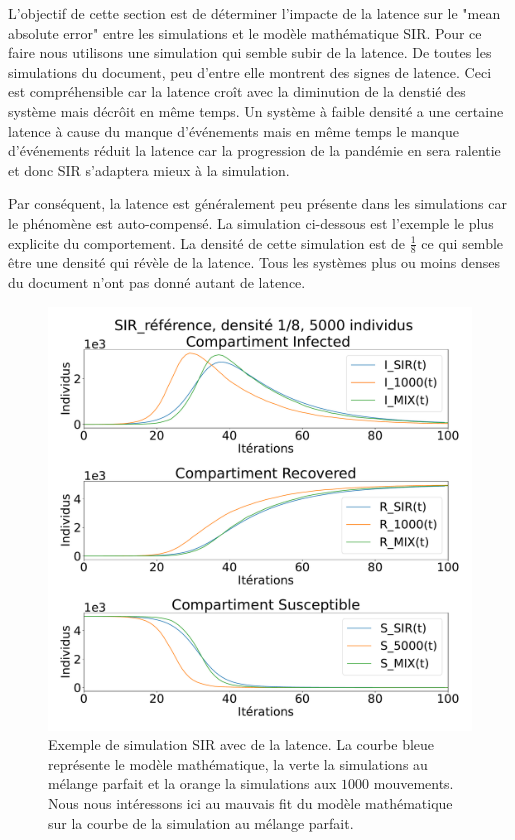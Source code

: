 L'objectif de cette section est de déterminer l'impacte de la latence sur le "mean absolute error" entre les simulations et le modèle mathématique SIR. Pour ce faire nous utilisons une simulation qui semble subir de la latence. De toutes les simulations du document, peu d'entre elle montrent des signes de latence. Ceci est compréhensible car la latence croît avec la diminution de la denstié des système mais décrôit en même temps. Un système à faible densité a une certaine latence à cause du manque d'événements mais en même temps le manque d'événements réduit la latence car la progression de la pandémie en sera ralentie et donc SIR s'adaptera mieux à la simulation.\\

\newpage 

Par conséquent, la latence est généralement peu présente dans les simulations car le phénomène est auto-compensé. La simulation ci-dessous est l'exemple le plus explicite du comportement. La densité de cette simulation est de $\frac{1}{8}$ ce qui semble être une densité qui révèle de la latence. Tous les systèmes plus ou moins denses du document n'ont pas donné autant de latence.

\begin{figure}[h]
	\centering
	\captionsetup{justification=centering}
	\includegraphics[width=.6\textwidth]{Images/SIR_ref_8_5.pdf}
	\caption[Simulation SIR avec latence]{Exemple de simulation SIR avec de la latence. La courbe bleue représente le modèle mathématique, la verte la simulations au mélange parfait et la orange la simulations aux $1000$ mouvements. Nous nous intéressons ici au mauvais fit du modèle mathématique sur la courbe de la simulation au mélange parfait.}
\end{figure}

